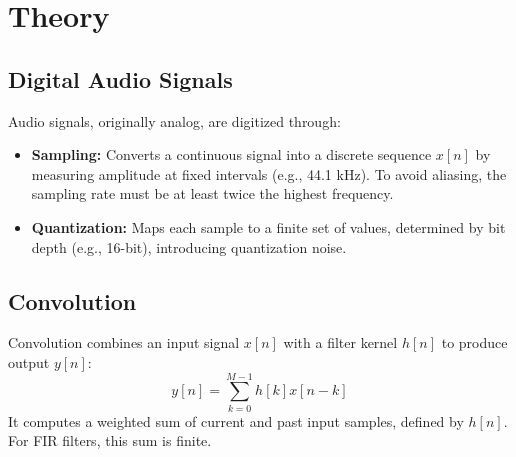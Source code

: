 \documentclass[12pt, a4paper]{article}
\begin{document}
\section{Theory}
\label{sec:theory}

\subsection{Digital Audio Signals}
Audio signals, originally analog, are digitized through:
\begin{itemize}
    \item \textbf{Sampling:} Converts a continuous signal into a discrete sequence $x[n]$ by measuring amplitude at fixed intervals (e.g., 44.1 kHz). To avoid aliasing, the sampling rate must be at least twice the highest frequency.
    \item \textbf{Quantization:} Maps each sample to a finite set of values, determined by bit depth (e.g., 16-bit), introducing quantization noise.
\end{itemize}

\subsection{Convolution}
Convolution combines an input signal $x[n]$ with a filter kernel $h[n]$ to produce output $y[n]$:
\begin{equation}
    y[n] = \sum_{k=0}^{M-1} h[k]x[n-k]
\end{equation}
It computes a weighted sum of current and past input samples, defined by $h[n]$. For FIR filters, this sum is finite.
\end{document}

